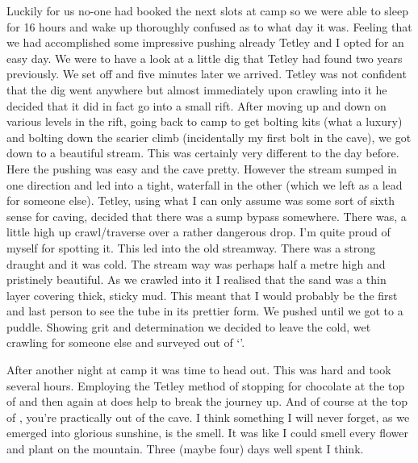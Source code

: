 
Luckily for us no-one had booked the next slots at camp so we were able to sleep for 16 hours and wake up thoroughly confused as to what day it was. Feeling that we had accomplished some impressive pushing already Tetley and I opted for an easy day. We were to have a look at a little dig that Tetley had found two years previously. We set off and five minutes later we arrived. Tetley was not confident that the dig went anywhere but almost immediately upon crawling into it he decided that it did in fact go into a small rift. After moving up and down on various levels in the rift, going back to camp to get bolting kits (what a luxury) and bolting down the scarier climb (incidentally my first bolt in the cave), we got down to a beautiful stream. This was certainly very different to the day before. Here the pushing was easy and the cave pretty. However the stream sumped in one direction and led into a tight, waterfall in the other (which we left as a lead for someone else). Tetley, using what I can only assume was some sort of sixth sense for caving, decided that there was a sump bypass somewhere. There was, a little high up crawl/traverse over a rather dangerous drop. I’m quite proud of myself for spotting it. This led into the old streamway. There was a strong draught and it was cold. The stream way was perhaps half a metre high and pristinely beautiful. As we crawled into it I realised that the sand was a thin layer covering thick, sticky mud. This meant that I would probably be the first and last person to see the tube in its prettier form. We pushed until we got to a puddle. Showing grit and determination we decided to leave the cold, wet crawling for someone else and surveyed out of ‘’.


After another night at camp it was time to head out. This was hard and took several hours. Employing the Tetley method of stopping for chocolate at the top of  and then again at  does help to break the journey up. And of course at the top of , you’re practically out of the cave. I think something I will never forget, as we emerged into glorious sunshine, is the smell. It was like I could smell every flower and plant on the mountain. Three (maybe four) days well spent I think.

